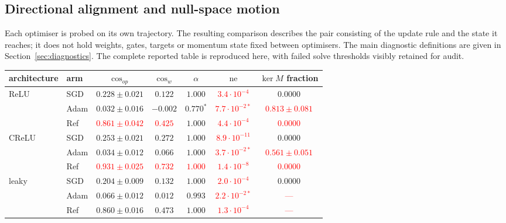 \documentclass{article}
\newcommand{\nat}[1]{\textcolor{red}{#1}}
\theoremstyle{definition}
\theoremstyle{remark}
\begin{document}
\subsection{Directional alignment and null-space motion}\label{app:e4}

Each optimiser is probed on its own trajectory. The resulting comparison describes the pair consisting of the update rule and the state it reaches; it does not hold weights, gates, targets or momentum state fixed between optimisers. The main diagnostic definitions are given in Section~\ref{sec:diagnostics}. The complete reported table is reproduced here, with failed solve thresholds visibly retained for audit.

\begin{center}\small
\begin{adjustbox}{max width=\linewidth}
\begin{tabular}{llccccc}
\toprule
architecture & arm & $\cos_{op}$ & $\cos_{w}$ & $\alpha$ & $\mathrm{ne}$ & $\ker M$ fraction \\
\midrule
ReLU   & SGD & $0.228 \pm 0.021$ & $0.122$  & $1.000$ & \nat{$3.4\cdot10^{-4}$} & $0.0000$ \\
       & Adam             & $0.032 \pm 0.016$ & $-0.002$ & $0.770^\ast$ & \nat{$7.7\cdot10^{-2\ast}$} & \nat{$\mathbf{0.813 \pm 0.081}$} \\
       & Ref        & \nat{$0.861 \pm 0.042$} & \nat{$0.425$}  & $1.000$ & \nat{$4.4\cdot10^{-4}$} & \nat{$0.0000$} \\
\midrule
CReLU  & SGD & $0.253 \pm 0.021$ & $0.272$  & $1.000$ & \nat{$8.9\cdot10^{-11}$} & $0.0000$ \\
       & Adam             & $0.034 \pm 0.012$ & $0.066$  & $1.000$ & \nat{$3.7\cdot10^{-2\ast}$} & \nat{$\mathbf{0.561 \pm 0.051}$} \\
       & Ref        & \nat{$0.931 \pm 0.025$} & \nat{$0.732$}  & \nat{$1.000$} & \nat{$1.4\cdot10^{-8}$} & \nat{$0.0000$} \\
\midrule
leaky  & SGD & $0.204 \pm 0.009$ & $0.132$  & $1.000$ & \nat{$2.0\cdot10^{-4}$} & $0.0000$ \\
       & Adam             & $0.066 \pm 0.012$ & $0.012$  & $0.993$ & \nat{$2.2\cdot10^{-2\ast}$} & \nat{---} \\
       & Ref        & $0.860 \pm 0.016$ & $0.473$  & $1.000$ & \nat{$1.3\cdot10^{-4}$} & \nat{---} \\
\bottomrule
\end{tabular}
\end{adjustbox}
\end{center}
\end{document}
